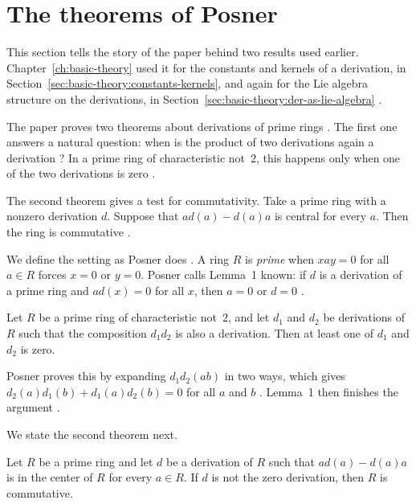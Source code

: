 \section{The theorems of Posner}\label{sec:prime-semiprime:posner}

This section tells the story of the paper behind two results used earlier.
Chapter~\ref{ch:basic-theory} used it for the constants and kernels of a
derivation, in Section~\ref{sec:basic-theory:constants-kernels}, and again for
the Lie algebra structure on the derivations, in
Section~\ref{sec:basic-theory:der-as-lie-algebra} \cite{Posner1957}.

The paper proves two theorems about derivations of prime rings
\cite[p.~1093]{Posner1957}. The first one answers a natural question: when is
the product of two derivations again a derivation
\cite[p.~1093]{Posner1957}? In a prime ring of
characteristic not~$2$, this happens only when one of the two derivations is
zero \cite[p.~1093]{Posner1957}.

The second theorem gives a test for commutativity. Take a prime ring with a
nonzero derivation $d$. Suppose that $ad(a)-d(a)a$ is central for every $a$.
Then the ring is commutative \cite[p.~1093]{Posner1957}.

We define the setting as Posner does \cite[p.~1093]{Posner1957}. A ring $R$ is
\emph{prime} when $xay=0$ for all $a\in R$ forces $x=0$ or $y=0$. Posner calls
Lemma~1 known: if $d$ is a derivation of a prime ring and $ad(x)=0$ for all $x$,
then $a=0$ or $d=0$ \cite[Lemma~1, p.~1093]{Posner1957}.

\begin{theorem}\label{thm:prime:posner-one}
Let $R$ be a prime ring of characteristic not~$2$, and let $d_1$ and $d_2$ be
derivations of $R$ such that the composition $d_1d_2$ is also a derivation.
Then at least one of $d_1$ and $d_2$ is zero.
\end{theorem}

Posner proves this by expanding $d_1d_2(ab)$ in two ways, which gives $d_2(a)d_1(b)+d_1(a)d_2(b)=0$ for all $a$ and $b$ \cite[p.~1094]{Posner1957}. Lemma~1 then finishes the argument \cite[p.~1094]{Posner1957}.

We state the second theorem next.

\begin{theorem}\label{thm:prime:posner-two}
Let $R$ be a prime ring and let $d$ be a derivation of $R$ such that
$ad(a)-d(a)a$ is in the center of $R$ for every $a\in R$. If $d$ is not the
zero derivation, then $R$ is commutative.
\end{theorem}

